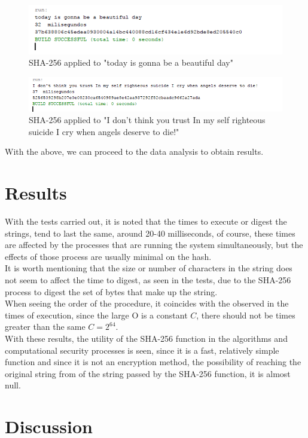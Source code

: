 \documentclass[journal]{IEEEtran}
\begin{document}
\begin{figure}[H] 
	\centering \includegraphics[width=.70\columnwidth]{Code_today.png}
	\caption{
		\label{fig:samplesetup}
		SHA-256 applied to "today is gonna be a beautiful day"
	}
\end{figure}
\begin{figure}[H] 
	\centering \includegraphics[width=.70\columnwidth]{Code_Long.png}
	\caption{
		\label{fig:samplesetup}
		SHA-256 applied to "I don't think you trust In my self righteous suicide I cry when angels deserve to die!"
	}
\end{figure}

With the above, we can proceed to the data analysis to obtain results.
\section{Results}
With the tests carried out, it is noted that the times to execute or digest the strings, tend to last the same, around 20-40 milliseconds,
of course, these times are affected by the processes that are running the system simultaneously, but the effects of those process are usually minimal on the hash.\\It is worth mentioning that the size or number of characters in the string does not seem to affect the time to digest, as seen in the tests, due to the SHA-256 process to digest the set of bytes that make up the string.\\When seeing the order of the procedure, it coincides with the observed in the times of execution, since the large O is a constant $C$, there should not be times greater than the same $C=2^{64}$.\\With these results, the utility of the SHA-256 function in the algorithms and computational security processes is seen, since it is a fast, relatively simple function and since it is not an encryption method, the possibility of reaching the original string from of the string passed by the SHA-256 function, it is almost null.
\section{Discussion}
\end{document}
